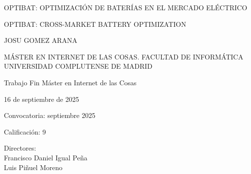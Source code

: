 \newpage

\thispagestyle{empty}

\begin{center}

  \vspace{1cm}

  {\large OPTIBAT\@: OPTIMIZACIÓN DE BATERÍAS EN EL MERCADO ELÉCTRICO}\\

  \vspace{0.5cm}

  {\large OPTIBAT\@: CROSS-MARKET BATTERY OPTIMIZATION}\\

  \vspace{0.5cm}

  \vspace{0.5cm}

  {\large JOSU GOMEZ ARANA}\\

  \vspace{0.5cm}

  MÁSTER EN INTERNET DE LAS COSAS\@. FACULTAD DE INFORMÁTICA\\
  UNIVERSIDAD COMPLUTENSE DE MADRID

  \vspace{0.5cm}

  Trabajo Fin Máster en Internet de las Cosas

  \vspace{0.5cm}

  16 de septiembre de 2025

  \vspace{0.5cm}

  {\large Convocatoria: septiembre 2025}\\

  \vspace{0.5cm}

  {\large Calificación: 9}\\

  \vspace{1cm}

\end{center}

{\raggedleft%
  Directores:\\
  \vspace{1cm}
  Francisco Daniel Igual Peña\\
  Luis Piñuel Moreno\\
}
